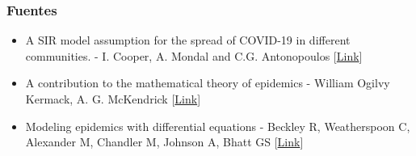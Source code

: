\documentclass{beamer}
\begin{document}
\begin{frame}
    \frametitle{Fuentes}

    \begin{itemize}
        \item A SIR model assumption for the spread of COVID-19 in different communities. - I. Cooper, A. Mondal and C.G. Antonopoulos [\href{https://www.sciencedirect.com/science/article/pii/S0960077920304549}{Link}]
        \item A contribution to the mathematical theory of epidemics - William Ogilvy Kermack, A. G. McKendrick [\href{https://royalsocietypublishing.org/doi/10.1098/rspa.1927.0118}{Link}]
        \item Modeling epidemics with differential equations - Beckley R, Weatherspoon C, Alexander M, Chandler M, Johnson A, Bhatt GS [\href{https://www.tnstate.edu/mathematics/mathreu/filesreu/GroupProjectSIR.pdf}{Link}]
    \end{itemize}
\end{frame}
\end{document}
